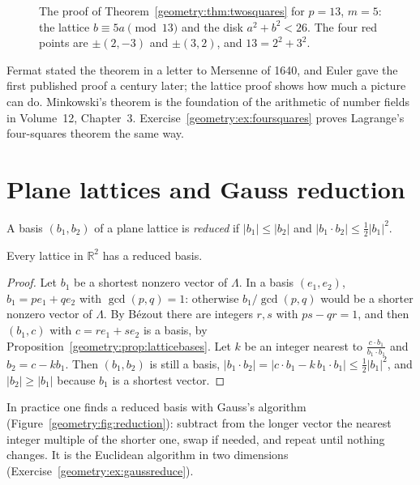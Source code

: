 \begin{figure}[ht]
\centering
{}
\caption{The proof of Theorem~\ref{geometry:thm:twosquares} for $p=13$, $m=5$: the lattice $b\equiv5a\pmod{13}$ and the disk $a^2+b^2<26$. The four red points are
$\pm(2,-3)$ and $\pm(3,2)$, and $13=2^2+3^2$.}
\label{geometry:fig:twosquares}
\end{figure}

Fermat stated the theorem in a letter to Mersenne of 1640, and Euler gave the first published proof a century later; the lattice proof shows how much a
picture can do. Minkowski's theorem is the foundation of the arithmetic of number fields in Volume~12, Chapter~3. Exercise~\ref{geometry:ex:foursquares} proves
Lagrange's four-squares theorem the same way.

\section{Plane lattices and Gauss reduction}

\begin{definition}
A basis $(b_1,b_2)$ of a plane lattice is \emph{reduced} if $|b_1|\le|b_2|$ and $|b_1\cdot b_2|\le\frac12|b_1|^2$.
\end{definition}

\begin{proposition}\label{geometry:prop:reducedexists}
Every lattice in $\mathbb R^2$ has a reduced basis.
\end{proposition}

\begin{proof}
Let $b_1$ be a shortest nonzero vector of $\Lambda$. In a basis $(e_1,e_2)$, $b_1=pe_1+qe_2$ with $\gcd(p,q)=1$: otherwise $b_1/\gcd(p,q)$ would be a
shorter nonzero vector of $\Lambda$. By B\'ezout there are integers $r,s$ with $ps-qr=1$, and then $(b_1,c)$ with $c=re_1+se_2$ is a basis, by
Proposition~\ref{geometry:prop:latticebases}. Let $k$ be an integer nearest to $\frac{c\cdot b_1}{b_1\cdot b_1}$ and $b_2=c-kb_1$. Then $(b_1,b_2)$ is still a basis,
$|b_1\cdot b_2|=|c\cdot b_1-k\,b_1\cdot b_1|\le\frac12|b_1|^2$, and $|b_2|\ge|b_1|$ because $b_1$ is a shortest vector.
\end{proof}

In practice one finds a reduced basis with Gauss's algorithm (Figure~\ref{geometry:fig:reduction}): subtract from the longer vector the nearest integer multiple of the
shorter one, swap if needed, and repeat until nothing changes. It is the Euclidean algorithm in two dimensions (Exercise~\ref{geometry:ex:gaussreduce}).

